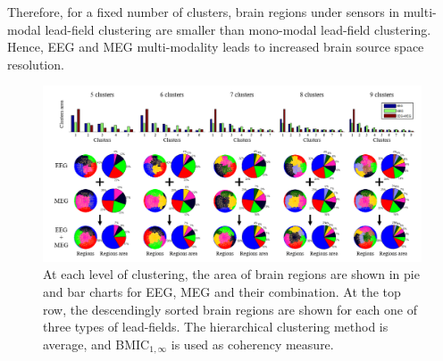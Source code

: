 Therefore, for a fixed number of clusters, brain regions under sensors in multi-modal lead-field clustering are smaller than mono-modal lead-field clustering.
Hence, EEG and MEG multi-modality leads to increased brain source space resolution.
\begin{figure}[!b]
\centering
\includegraphics[width=1\textwidth,keepaspectratio]{images/EMEG_regionsArea.png} %
\centering
\caption{At each level of clustering, the area of brain regions are shown in pie and bar charts for EEG, MEG and their combination. At the top row, the descendingly sorted brain regions are shown for each one of three types of lead-fields. The hierarchical clustering method is average, and BMIC$_{1,\infty}$ is used as coherency measure.
}
\label{fig:EMEG_regionsArea}
\end{figure}
\FloatBarrier
